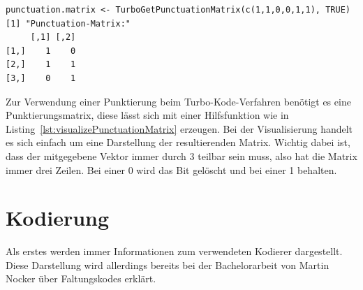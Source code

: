 \begin{lstlisting}[caption=Visualisierung der Punktierungssmatrix, label={lst:visualizePunctuationMatrix}, float=th]
punctuation.matrix <- TurboGetPunctuationMatrix(c(1,1,0,0,1,1), TRUE)
[1] "Punctuation-Matrix:"
     [,1] [,2]
[1,]    1    0
[2,]    1    1
[3,]    0    1
\end{lstlisting}

Zur Verwendung einer Punktierung beim Turbo-Kode-Verfahren benötigt es eine Punktierungsmatrix, diese lässt sich mit einer Hilfsfunktion wie in Listing~\ref{lst:visualizePunctuationMatrix} erzeugen. Bei der Visualisierung handelt es sich einfach um eine Darstellung der resultierenden Matrix. Wichtig dabei ist, dass der mitgegebene Vektor immer durch 3 teilbar sein muss, also hat die Matrix immer drei Zeilen. Bei einer 0 wird das Bit gelöscht und bei einer 1 behalten.

\FloatBarrier
\section{Kodierung}
\label{sec:visualization_encode}
Als erstes werden immer Informationen zum verwendeten Kodierer dargestellt. Diese Darstellung wird allerdings bereits bei der Bachelorarbeit von Martin Nocker über Faltungskodes erklärt. \cite{nocker}

